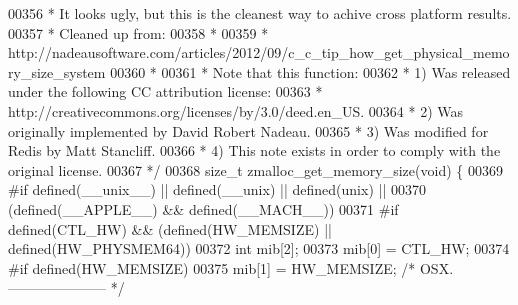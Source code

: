 \begin{DoxyCode}
{{{00356 \textcolor{comment}{ * It looks ugly, but this is the cleanest way to achive cross platform results.}
00357 \textcolor{comment}{ * Cleaned up from:}
00358 \textcolor{comment}{ *}
00359 \textcolor{comment}{ * http://nadeausoftware.com/articles/2012/09/c\_c\_tip\_how\_get\_physical\_memory\_size\_system}
00360 \textcolor{comment}{ *}
00361 \textcolor{comment}{ * Note that this function:}
00362 \textcolor{comment}{ * 1) Was released under the following CC attribution license:}
00363 \textcolor{comment}{ *    http://creativecommons.org/licenses/by/3.0/deed.en\_US.}
00364 \textcolor{comment}{ * 2) Was originally implemented by David Robert Nadeau.}
00365 \textcolor{comment}{ * 3) Was modified for Redis by Matt Stancliff.}
00366 \textcolor{comment}{ * 4) This note exists in order to comply with the original license.}
00367 \textcolor{comment}{ */}
00368 size\_t zmalloc\_get\_memory\_size(\textcolor{keywordtype}{void}) \{
00369 \textcolor{preprocessor}{#}\textcolor{preprocessor}{if} \textcolor{preprocessor}{defined}\textcolor{preprocessor}{(}\_\_unix\_\_\textcolor{preprocessor}{)} \textcolor{preprocessor}{||} \textcolor{preprocessor}{defined}\textcolor{preprocessor}{(}\_\_unix\textcolor{preprocessor}{)} \textcolor{preprocessor}{||} \textcolor{preprocessor}{defined}\textcolor{preprocessor}{(}unix\textcolor{preprocessor}{)} \textcolor{preprocessor}{||}
00370     \textcolor{preprocessor}{(}\textcolor{preprocessor}{defined}\textcolor{preprocessor}{(}\textcolor{preprocessor}{\_\_APPLE\_\_}\textcolor{preprocessor}{)} \textcolor{preprocessor}{&&} \textcolor{preprocessor}{defined}\textcolor{preprocessor}{(}\textcolor{preprocessor}{\_\_MACH\_\_}\textcolor{preprocessor}{)}\textcolor{preprocessor}{)}
00371 \textcolor{preprocessor}{#}\textcolor{preprocessor}{if} \textcolor{preprocessor}{defined}\textcolor{preprocessor}{(}\textcolor{preprocessor}{CTL\_HW}\textcolor{preprocessor}{)} \textcolor{preprocessor}{&&} \textcolor{preprocessor}{(}\textcolor{preprocessor}{defined}\textcolor{preprocessor}{(}\textcolor{preprocessor}{HW\_MEMSIZE}\textcolor{preprocessor}{)} \textcolor{preprocessor}{||} \textcolor{preprocessor}{defined}\textcolor{preprocessor}{(}\textcolor{preprocessor}{HW\_PHYSMEM64}\textcolor{preprocessor}{)}\textcolor{preprocessor}{)}
00372     \textcolor{keywordtype}{int} mib[2];
00373     mib[0] = CTL\_HW;
00374 \textcolor{preprocessor}{#}\textcolor{preprocessor}{if} \textcolor{preprocessor}{defined}\textcolor{preprocessor}{(}\textcolor{preprocessor}{HW\_MEMSIZE}\textcolor{preprocessor}{)}
00375     mib[1] = HW\_MEMSIZE;            \textcolor{comment}{/* OSX. --------------------- */}
}}}
\end{DoxyCode}
